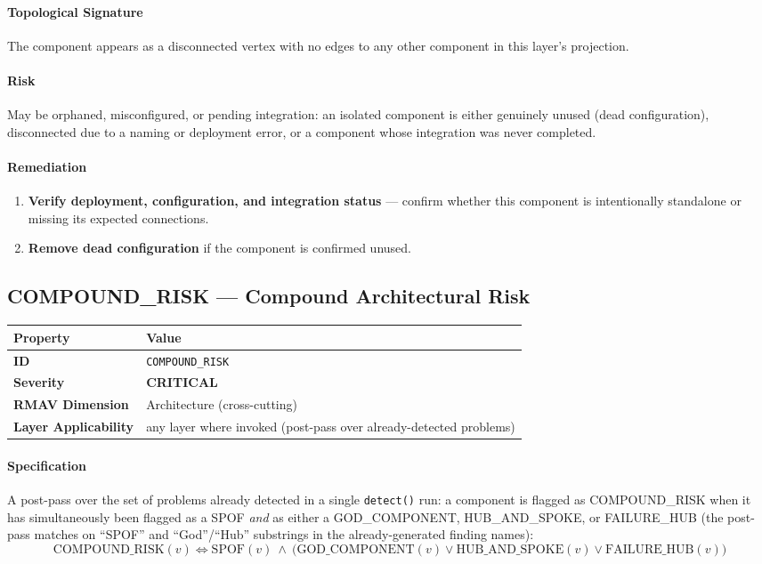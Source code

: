 \documentclass[11pt]{article}
\makeatletter
\newcommand{\CRITICAL}{\textcolor{red!70!black}{\textbf{CRITICAL}}}
\newcommand{\patternprop}[4]{%
  \begin{center}
  \begin{tabular}{@{}ll@{}}
  \toprule
  \textbf{Property} & \textbf{Value} \\
  \midrule
  \textbf{ID} & \texttt{#1} \\
  \textbf{Severity} & #2 \\
  \textbf{RMAV Dimension} & #3 \\
  \textbf{Layer Applicability} & #4 \\
  \bottomrule
  \end{tabular}
  \end{center}
}
\makeatother
\begin{document}
\paragraph{Topological Signature}
The component appears as a disconnected vertex with no edges to any other component in this layer's projection.

\paragraph{Risk}
May be orphaned, misconfigured, or pending integration: an isolated component is either genuinely unused (dead configuration), disconnected due to a naming or deployment error, or a component whose integration was never completed.

\paragraph{Remediation}
\begin{enumerate}[leftmargin=*]
\item \textbf{Verify deployment, configuration, and integration status} --- confirm whether this component is intentionally standalone or missing its expected connections.
\item \textbf{Remove dead configuration} if the component is confirmed unused.
\end{enumerate}

\subsection{COMPOUND\_RISK --- Compound Architectural Risk}
\patternprop{COMPOUND\_RISK}{\CRITICAL}{Architecture (cross-cutting)}{any layer where invoked (post-pass over already-detected problems)}

\paragraph{Specification}
A post-pass over the set of problems already detected in a single \texttt{detect()} run: a component is flagged as COMPOUND\_RISK when it has simultaneously been flagged as a SPOF \emph{and} as either a GOD\_COMPONENT, HUB\_AND\_SPOKE, or FAILURE\_HUB (the post-pass matches on ``SPOF'' and ``God''/``Hub'' substrings in the already-generated finding names):
\[
\mathrm{COMPOUND\_RISK}(v) \Leftrightarrow \mathrm{SPOF}(v)\ \land\ \big(\mathrm{GOD\_COMPONENT}(v) \lor \mathrm{HUB\_AND\_SPOKE}(v) \lor \mathrm{FAILURE\_HUB}(v)\big)
\]
\end{document}
